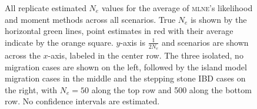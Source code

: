 \begin{landscape}
\begin{figure}[ht]
\centering
{}
\caption[ ~~ - All replicate estimated $N_e$ values for the average of \textsc{mlne}'s likelihood and moment methods across all scenarios.]{All replicate estimated $N_e$ values for the average of \textsc{mlne}'s likelihood and moment methods across all scenarios. True $N_e$ is shown by the horizontal green lines, point estimates in red with their average indicate by the orange square. $y$-axis is $\frac{1}{2 N_e}$ and scenarios are shown across the $x$-axis, labeled in the center row. The three isolated, no migration cases are shown on the left, followed by the island model migration cases in the middle and the stepping stone IBD cases on the right, with $N_e = 50$ along the top row and 500 along the bottom row. No confidence intervals are estimated.}
\label{fig:supp_avg1}
\end{figure}



\end{landscape}
